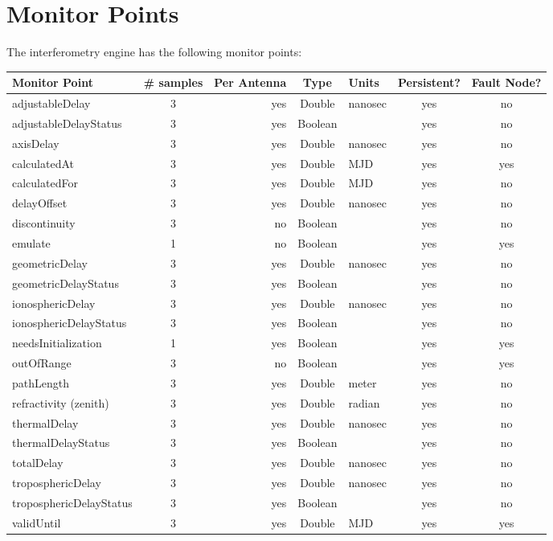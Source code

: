 \documentclass[preprint]{aastex}
\begin{document}
\section{Monitor Points}
The interferometry engine has the following monitor points:

\begin{tabular}{lcrclcc}
\hline
Monitor Point & \# samples & Per Antenna & Type & Units & Persistent? & Fault Node?\\
\hline
adjustableDelay       & 3  & yes & Double  & nanosec & yes & no\\
adjustableDelayStatus & 3  & yes & Boolean &         & yes & no\\
axisDelay             & 3  & yes & Double  & nanosec & yes & no\\
calculatedAt          & 3  & yes & Double  & MJD     & yes & yes\\
calculatedFor         & 3  & yes & Double  & MJD     & yes & no\\
delayOffset           & 3  & yes & Double  & nanosec & yes & no\\
discontinuity         & 3  & no  & Boolean &         & yes & no \\
emulate               & 1  & no  & Boolean &         & yes & yes\\
geometricDelay        & 3  & yes & Double  & nanosec & yes & no\\
geometricDelayStatus  & 3  & yes & Boolean &         & yes & no\\
ionosphericDelay      & 3  & yes & Double  & nanosec & yes & no\\
ionosphericDelayStatus& 3  & yes & Boolean &         & yes & no\\
needsInitialization   & 1  & yes & Boolean &         & yes & yes\\
outOfRange            & 3  & no  & Boolean &         & yes & yes\\
pathLength            & 3  & yes & Double  & meter   & yes & no\\
refractivity (zenith) & 3  & yes & Double  & radian  & yes & no\\
thermalDelay          & 3  & yes & Double  & nanosec & yes & no\\
thermalDelayStatus    & 3  & yes & Boolean &         & yes & no\\
totalDelay            & 3  & yes & Double  & nanosec & yes & no\\
troposphericDelay     & 3  & yes & Double  & nanosec & yes & no\\
troposphericDelayStatus& 3 & yes & Boolean &         & yes & no\\
validUntil            & 3  & yes & Double  & MJD     & yes & yes\\
\hline 
\end{tabular}
\end{document}
